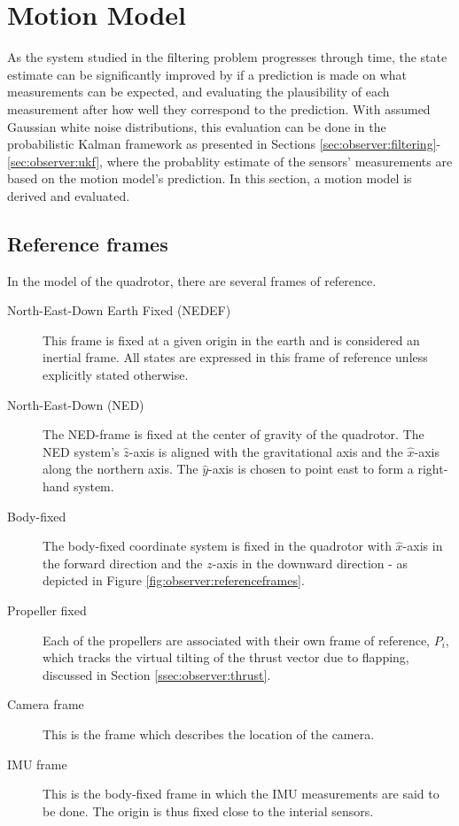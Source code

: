 \section{Motion Model}
\label{sec:observer:motionmodel}
    As the system studied in the filtering problem progresses through time,
    the state estimate can be significantly improved by if a prediction
    is made on what measurements can be expected, and evaluating the plausibility
    of each measurement after how well they correspond to the prediction.
    With assumed Gaussian white noise distributions, this evaluation
    can be done in the probabilistic Kalman framework as presented in Sections
    \ref{sec:observer:filtering}-\ref{sec:observer:ukf}, where the
    probablity estimate of the sensors' measurements are based on the motion
    model's prediction. In this section, a motion model is derived and evaluated.

    \subsection{Reference frames}
        In the model of the quadrotor, there are several frames of reference.
        \begin{description}
            \item[North-East-Down Earth Fixed (NEDEF)] This frame is fixed at
            a given origin in the earth and is considered an inertial frame.
            All states are expressed in this frame of reference unless explicitly stated otherwise.

            \item[North-East-Down (NED)]
            The NED-frame is fixed at the center of gravity of the quadrotor.
            The NED system's $\hat{z}$-axis is aligned with the gravitational axis and
            the $\hat{x}$-axis along the northern axis.
            The $\hat{y}$-axis is chosen to point east to form a right-hand system.

            \item[Body-fixed] The body-fixed coordinate system is fixed in the
            quadrotor with $\hat{x}$-axis in the forward direction and the $z$-axis in the downward
            direction - as depicted in Figure \ref{fig:observer:referenceframes}.

            \item[Propeller fixed] Each of the propellers are associated
            with their own frame of reference, $P_{i}$, which tracks the
            virtual tilting of the thrust vector due to flapping,
            discussed in Section \ref{ssec:observer:thrust}.

            \item[Camera frame] This is the frame which describes the
            location of the camera.

            \item[IMU frame] This is the body-fixed frame in which the IMU measurements are said
            to be done. The origin is thus fixed close to the interial sensors.
        \end{description}

